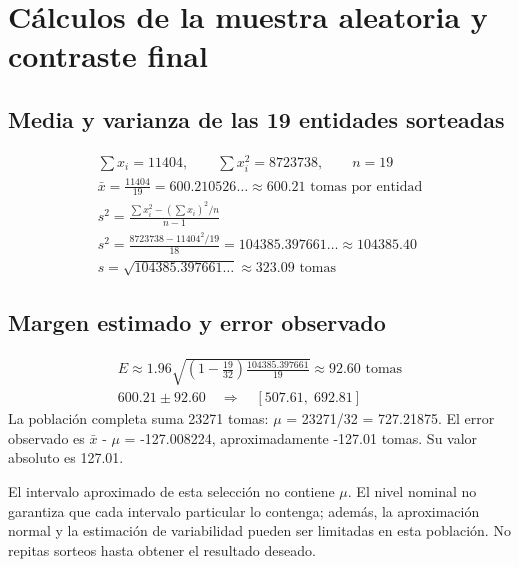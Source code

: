 \documentclass[11pt,letterpaper]{article}
\begin{document}
\clearpage
\section{Cálculos de la muestra aleatoria y contraste final}
\subsection{Media y varianza de las 19 entidades sorteadas}
\begin{gather*}\sum x_i=11404,\qquad\sum x_i^2=8723738,\qquad n=19\\[3pt]\bar{x}=\frac{11404}{19}=600.210526\ldots\approx600.21\text{ tomas por entidad}\\[3pt]s^2=\frac{\sum x_i^2-(\sum x_i)^2/n}{n-1}\\[3pt]s^2=\frac{8723738-11404^2/19}{18}=104385.397661\ldots\approx104385.40\\[3pt]s=\sqrt{104385.397661\ldots}\approx323.09\text{ tomas}\end{gather*}
\subsection{Margen estimado y error observado}
\begin{gather*}E\approx1.96\sqrt{\left(1-\frac{19}{32}\right)\frac{104385.397661}{19}}\approx92.60\text{ tomas}\\[3pt]600.21\pm92.60\quad\Rightarrow\quad[507.61,\;692.81]\end{gather*}
La población completa suma 23271 tomas: \(\mu\) = 23271/32 = 727.21875. El error observado es \(\bar{x}\) - \(\mu\) = -127.008224, aproximadamente -127.01 tomas. Su valor absoluto es 127.01.

El intervalo aproximado de esta selección no contiene \(\mu\). El nivel nominal no garantiza que cada intervalo particular lo contenga; además, la aproximación normal y la estimación de variabilidad pueden ser limitadas en esta población. No repitas sorteos hasta obtener el resultado deseado.
\end{document}
